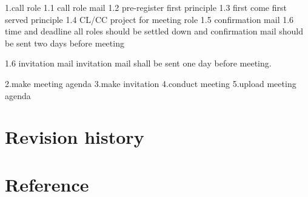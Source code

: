 1.call role
1.1 call role mail
1.2 pre-register first principle
1.3 first come first served principle
1.4 CL/CC project for meeting role
1.5 confirmation mail
1.6 time and deadline
    all roles should be settled down and confirmation mail 
    should be sent two days before meeting

1.6 invitation mail
    invitation mail shall be sent one day before meeting.


2.make meeting agenda
3.make invitation
4.conduct meeting
5.upload meeting agenda


\section{Revision history}
\section{Reference}




